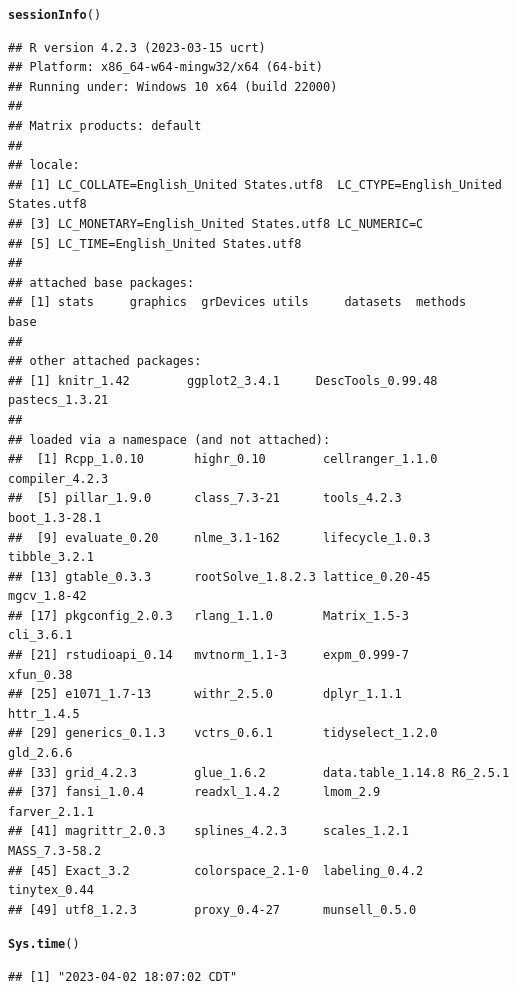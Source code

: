 \documentclass{article}\usepackage[]{graphicx}\usepackage[]{xcolor}
\makeatletter
\newcommand{\hlstd}[1]{\textcolor[rgb]{0.345,0.345,0.345}{#1}}%
\newcommand{\hlkwd}[1]{\textcolor[rgb]{0.737,0.353,0.396}{\textbf{#1}}}%
\newenvironment{kframe}{%
 \def\at@end@of@kframe{}%
 \ifinner\ifhmode%
  \def\at@end@of@kframe{\end{minipage}}%
  \begin{minipage}{\columnwidth}%
 \fi\fi%
 \def\FrameCommand##1{\hskip\@totalleftmargin \hskip-\fboxsep
 \colorbox{shadecolor}{##1}\hskip-\fboxsep
     \hskip-\linewidth \hskip-\@totalleftmargin \hskip\columnwidth}%
 \MakeFramed {\advance\hsize-\width
   \@totalleftmargin\z@ \linewidth\hsize
   \@setminipage}}%
 {\par\unskip\endMakeFramed%
 \at@end@of@kframe}
\newenvironment{knitrout}{}{} %
\makeatother
\begin{document}
\begin{knitrout}
\color{fgcolor}\begin{kframe}
\begin{alltt}
\hlkwd{sessionInfo}\hlstd{()}
\end{alltt}
\begin{verbatim}
## R version 4.2.3 (2023-03-15 ucrt)
## Platform: x86_64-w64-mingw32/x64 (64-bit)
## Running under: Windows 10 x64 (build 22000)
## 
## Matrix products: default
## 
## locale:
## [1] LC_COLLATE=English_United States.utf8  LC_CTYPE=English_United States.utf8   
## [3] LC_MONETARY=English_United States.utf8 LC_NUMERIC=C                          
## [5] LC_TIME=English_United States.utf8    
## 
## attached base packages:
## [1] stats     graphics  grDevices utils     datasets  methods   base     
## 
## other attached packages:
## [1] knitr_1.42        ggplot2_3.4.1     DescTools_0.99.48 pastecs_1.3.21   
## 
## loaded via a namespace (and not attached):
##  [1] Rcpp_1.0.10       highr_0.10        cellranger_1.1.0  compiler_4.2.3   
##  [5] pillar_1.9.0      class_7.3-21      tools_4.2.3       boot_1.3-28.1    
##  [9] evaluate_0.20     nlme_3.1-162      lifecycle_1.0.3   tibble_3.2.1     
## [13] gtable_0.3.3      rootSolve_1.8.2.3 lattice_0.20-45   mgcv_1.8-42      
## [17] pkgconfig_2.0.3   rlang_1.1.0       Matrix_1.5-3      cli_3.6.1        
## [21] rstudioapi_0.14   mvtnorm_1.1-3     expm_0.999-7      xfun_0.38        
## [25] e1071_1.7-13      withr_2.5.0       dplyr_1.1.1       httr_1.4.5       
## [29] generics_0.1.3    vctrs_0.6.1       tidyselect_1.2.0  gld_2.6.6        
## [33] grid_4.2.3        glue_1.6.2        data.table_1.14.8 R6_2.5.1         
## [37] fansi_1.0.4       readxl_1.4.2      lmom_2.9          farver_2.1.1     
## [41] magrittr_2.0.3    splines_4.2.3     scales_1.2.1      MASS_7.3-58.2    
## [45] Exact_3.2         colorspace_2.1-0  labeling_0.4.2    tinytex_0.44     
## [49] utf8_1.2.3        proxy_0.4-27      munsell_0.5.0
\end{verbatim}
\begin{alltt}
\hlkwd{Sys.time}\hlstd{()}
\end{alltt}
\begin{verbatim}
## [1] "2023-04-02 18:07:02 CDT"
\end{verbatim}
\end{kframe}
\end{knitrout}
\end{document}
